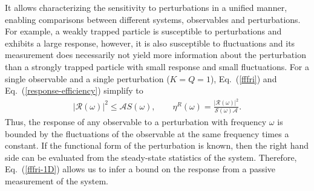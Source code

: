 \documentclass[aps,pre,twocolumn,superscriptaddress,notitlepage]{revtex4-2}
\renewcommand{\eqref}[1]{Eq.~(\ref{#1})}
\begin{document}
It allows characterizing the sensitivity to perturbations in a unified manner, enabling comparisons between different systems, observables and perturbations.
For example, a weakly trapped particle is susceptible to perturbations and exhibits a large response, however, it is also susceptible to fluctuations and its measurement does necessarily not yield more information about the perturbation than a strongly trapped particle with small response and small fluctuations.
For a single observable and a single perturbation ($K = Q = 1$), \eqref{fffri} and \eqref{response-efficiency} simplify to
\begin{align}
\big\vert \mathcal{R}(\omega) \big\vert^2 \leq \mathcal{A} S(\omega), \qquad \eta^R(\omega) = \frac{\vert \mathcal{R}(\omega) \vert^2}{\mathcal{S}(\omega) \mathcal{A}} \label{fffri-1D}.
\end{align}
Thus, the response of any observable to a perturbation with frequency $\omega$ is bounded by the fluctuations of the observable at the same frequency times a constant.
If the functional form of the perturbation is known, then the right hand side can be evaluated from the steady-state statistics of the system.
Therefore, \eqref{fffri-1D} allows us to infer a bound on the response from a passive measurement of the system.
\end{document}
